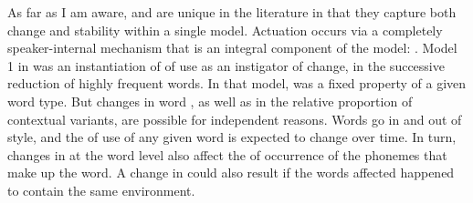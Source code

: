 As far as I am aware, \citet{soskuthy2013phonetic} and \citet{Soskuthy2015}
are unique in the literature in that they capture both change and
stability within a single model. Actuation occurs via a completely
speaker-internal mechanism that is an integral component of the model:
 . Model 1 in 
was an instantiation of  of use as an instigator of change,
in the successive reduction of highly frequent words. In that model,
 was a fixed property of a given word type. But changes in
word , as well as in the relative proportion of contextual
variants, are possible for independent reasons. Words go in and out
of style, and the  of use of any given word is expected to
change over time. In turn, changes in  at the word level
also affect the  of occurrence of the phonemes that make
up the word. A change in   could also result if
the words affected happened to contain the same  environment. 

